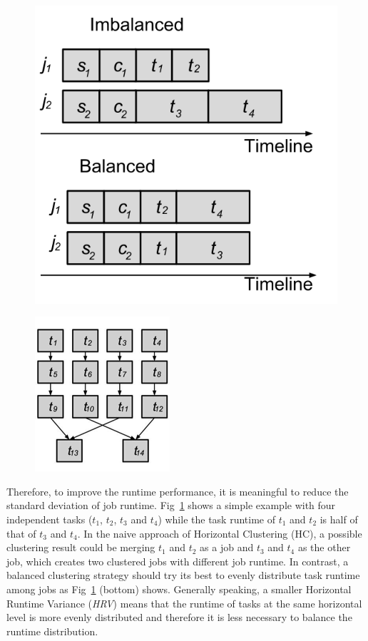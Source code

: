 \begin{figure}

\centering
  \includegraphics[width=0.5\linewidth]{figures/balance/rv.png}
  \label{fig:rv}
\end{figure}
\begin{figure}
\centering
  \includegraphics[width=0.3\linewidth]{figures/balance/pipeline.png}
  \label{fig:pipeline}
\end{figure}



Therefore, to improve the runtime performance, it is meaningful to reduce the standard deviation of job runtime. Fig~\ref{fig:rv} shows a simple example with four independent tasks ($t_1$, $t_2$, $t_3$ and $t_4$) while the task runtime of $t_1$ and $t_2$ is half of that of $t_3$ and $t_4$. In the naive approach of Horizontal Clustering (HC), a possible clustering result could be merging $t_1$ and $t_2$ as a job and $t_3$ and $t_4$ as the other job, which creates two clustered jobs with different job runtime. In contrast, a balanced clustering strategy should try its best to evenly distribute task runtime among jobs as Fig~\ref{fig:rv} (bottom) shows. Generally speaking, a smaller Horizontal Runtime Variance ({\em HRV}) means that the runtime of tasks at the same horizontal level is more evenly distributed and therefore it is less necessary to balance the runtime distribution. 


